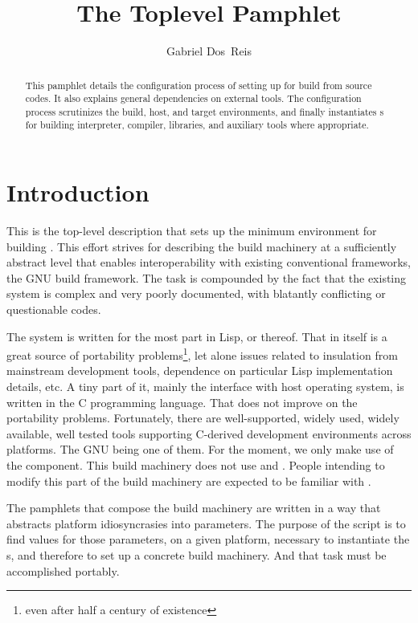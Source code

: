 \documentclass[12pt]{article}
\title{The Toplevel \File{configure.ac} Pamphlet}
\author{Gabriel Dos~Reis}
\begin{document}
\maketitle

\begin{abstract}
  This pamphlet details the configuration process of setting up
   for build from source codes.
  It also explains general dependencies on external tools.
  The configuration process scrutinizes the build, host,  and target
  environments, and finally instantiates s for building
   interpreter, compiler, libraries, and auxiliary tools
  where appropriate.
\end{abstract}

\section{Introduction}
\label{sec:intro}

This is the top-level  description that sets up the
minimum environment for building .  This effort
strives for describing the build machinery at a sufficiently abstract
level that
enables interoperability with existing conventional frameworks, \eg{}
the GNU build framework.
The task is compounded by the fact that the existing  system
is complex and very poorly documented, with blatantly conflicting or
questionable codes.

The  system is written for the most part in Lisp, or
thereof.  That in itself is a great source of portability
problems\footnote{even after half a century of existence},
let alone issues related to insulation from mainstream
development tools, dependence on particular Lisp implementation details, etc.
A tiny part of it, mainly the interface with host operating system, is
written in the C programming language.  That does not improve on the
portability problems.  Fortunately, there are well-supported,
widely used, widely available, well tested tools supporting
C-derived development environments across platforms.  The GNU
 being one of them.  For the moment, we only make use of
the  component.  This build machinery does not
use  and .  People intending to modify
this part of the build machinery are expected to be familiar with
.

The  pamphlets that compose the build machinery are
written in a way that abstracts platform idiosyncrasies into
parameters.  The purpose of the  script is to
find values for those parameters, on a given platform, necessary to
instantiate the s, and therefore to set up a concrete
build machinery.  And that task must be accomplished portably.
\end{document}
